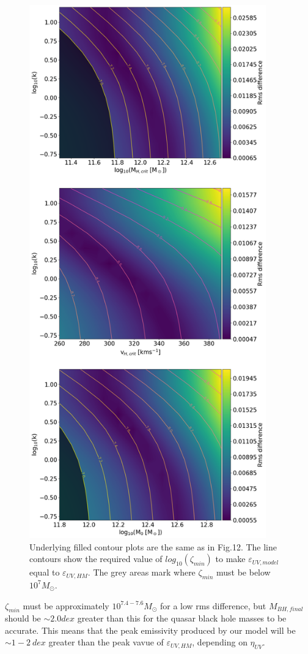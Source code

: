 \documentclass[12pt, twocolumn]{report}%
\begin{document}
\begin{figure}[H]
\centering
\includegraphics[width=10.25cm]{Contour_2.png}
\caption{Underlying filled contour plots are the same as in Fig.12. The line contours show the required value of $log_{10}(\zeta_{min})$ to make $\varepsilon_{UV,model}$ equal to $\varepsilon_{UV,HM}$. The grey areas mark where $\zeta_{min}$ must be below $10^7M_\odot$.}
\label{fig:13}
\end{figure}
\clearpage
\twocolumngrid


\noindent $\zeta_{min}$ must be approximately $10^{7.4-7.6}M_\odot$ for a low rms difference, but $M_{BH,final}$ should be $\sim2.0dex$ greater than this for the quasar black hole masses to be accurate. This means that the peak emissivity produced by our model will be $\sim1-2\:dex$ greater than the peak vavue of $\varepsilon_{UV,HM}$, depending on $\eta_{UV}$.\par
\end{document}
